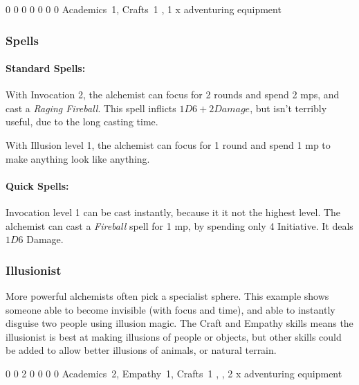{\begin{multicols}{2}

{0}%
{0}%
{{0}%
{0}%
{0}}%
{0}%
{0}%
{Academics~1, Crafts~1}%
{\Dagger, 1 x adventuring equipment}%
{}

\subsubsection{Spells}

\paragraph{Standard Spells:}
With Invocation 2, the alchemist can focus for 2 rounds and spend 2 \glspl{mp}, and cast a \textit{Raging Fireball}.
This spell inflicts $1D6+2 Damage$, but isn't terribly useful, due to the long casting time.

With Illusion level 1, the alchemist can focus for 1 round and spend 1 \gls{mp} to make anything look like anything.

\paragraph{Quick Spells:}
Invocation level 1 can be cast instantly, because it it not the highest level.
The alchemist can cast a \textit{Fireball} spell for 1 \gls{mp}, by spending only 4 Initiative.
It deals $1D6$ Damage.

\subsubsection{Illusionist}

More powerful alchemists often pick a specialist sphere.
This example shows someone able to become invisible (with focus and time), and able to instantly disguise two people using illusion magic.
The Craft and Empathy skills means the illusionist is best at making illusions of people or objects, but other skills could be added to allow better illusions of animals, or natural terrain.


{0}%
{0}%
{{2}%
{0}%
{0}}%
{0}%
{0}%
{Academics~2, Empathy~1, Crafts~1}%
{\Dagger, \completeleather, 2 x adventuring equipment}%
{}


\end{multicols}}
